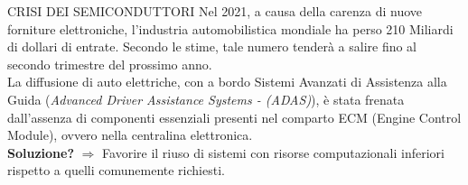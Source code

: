 {


\begin{frame}{CRISI DEI SEMICONDUTTORI}
    \renewcommand{\thefootnote}{\fnsymbol{footnote}}
    Nel 2021, a causa della carenza di nuove forniture elettroniche, l'industria 
    automobilistica mondiale ha perso 210 Miliardi di dollari di entrate\footnotemark[1].
    Secondo le stime, tale numero tenderà a salire fino al secondo trimestre 
    del prossimo anno.\\
    \vspace{0.3cm}
    La diffusione di auto elettriche, con a bordo Sistemi 
    Avanzati di Assistenza alla Guida (\emph{Advanced Driver Assistance Systems - 
    (ADAS)}), è stata frenata dall'assenza di componenti essenziali presenti nel comparto ECM (Engine Control Module), ovvero nella centralina elettronica.\\
    \vspace{0.3cm}
    {\bfseries{Soluzione?}} $\Rightarrow$ Favorire il riuso di sistemi con risorse computazionali inferiori rispetto a quelli comunemente richiesti.
\end{frame}

}

